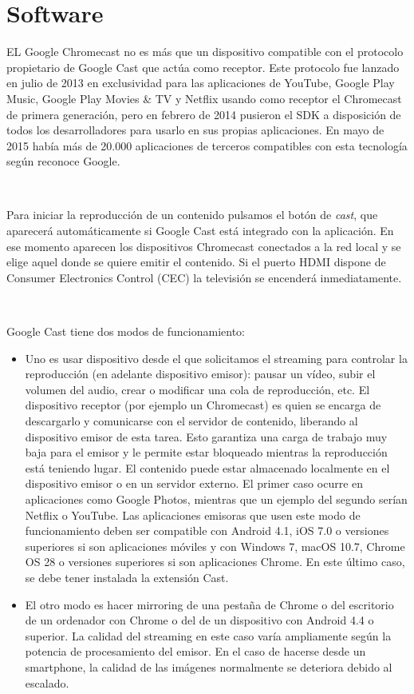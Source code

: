\section{Software}

EL Google Chromecast no es más que un dispositivo compatible con el protocolo propietario de Google Cast que actúa como receptor.
Este protocolo fue lanzado en julio de 2013 en exclusividad para las aplicaciones de YouTube, Google Play Music, Google Play Movies & TV y Netflix usando como receptor el Chromecast de primera generación, pero en febrero de 2014 pusieron el SDK a disposición de todos los desarrolladores para usarlo en sus propias aplicaciones.
En mayo de 2015 había más de 20.000 aplicaciones de terceros compatibles con esta tecnología según reconoce Google.

\

Para iniciar la reproducción de un contenido pulsamos el botón de \textit{cast}, que aparecerá automáticamente si Google Cast está integrado con la aplicación.
En ese momento aparecen los dispositivos Chromecast conectados a la red local y se elige aquel donde se quiere emitir el contenido.
Si el puerto HDMI dispone de Consumer Electronics Control (CEC) la televisión se encenderá inmediatamente.

\

Google Cast tiene dos modos de funcionamiento:

\begin{itemize}

	\item Uno es usar dispositivo desde el que solicitamos el streaming para controlar la reproducción (en adelante dispositivo emisor): pausar un vídeo, subir el volumen del audio, crear o modificar una cola de reproducción, etc.
	El dispositivo receptor (por ejemplo un Chromecast) es quien se encarga de descargarlo y comunicarse con el servidor de contenido, liberando al dispositivo emisor de esta tarea.
	Esto garantiza una carga de trabajo muy baja para el emisor y le permite estar bloqueado mientras la reproducción está teniendo lugar.
	El contenido puede estar almacenado localmente en el dispositivo emisor o en un servidor externo.
	El primer caso ocurre en aplicaciones como Google Photos, mientras que un ejemplo del segundo serían Netflix o YouTube.
	Las aplicaciones emisoras que usen este modo de funcionamiento deben ser compatible con Android 4.1, iOS 7.0 o versiones superiores si son aplicaciones móviles y con Windows 7, macOS 10.7, Chrome OS 28 o versiones superiores si son aplicaciones Chrome.
	En este último caso, se debe tener instalada la extensión Cast.

	\item El otro modo es hacer mirroring de una pestaña de Chrome o del escritorio de un ordenador con Chrome o del de un dispositivo con Android 4.4 o superior.
	La calidad del streaming en este caso varía ampliamente según la potencia de procesamiento del emisor.
	En el caso de hacerse desde un smartphone, la calidad de las imágenes normalmente se deteriora debido al escalado.

\end{itemize}

